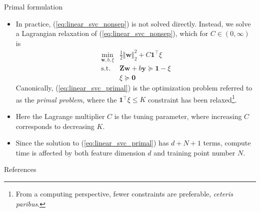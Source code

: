 \documentclass{beamer}
\numberwithin{equation}{section}
\newcommand{\aref}[1]{\alert{\ref{#1}}}
\begin{document}
\begin{frame}{Primal formulation}
    \begin{itemize}
        \item
        In practice, (\aref{eq:linear_svc_nonsep}) is not solved
        directly. Instead, we solve a Lagrangian relaxation of
        (\aref{eq:linear_svc_nonsep}), which for $ C \in (0, \infty) $ is
        \begin{equation} \label{eq:linear_svc_primal}
            \begin{array}{ll}
                \displaystyle\min_{\mathbf{w}, b, \xi} &
                \frac{1}{2}\Vert\mathbf{w}\Vert_2^2 + C\mathbf{1}^\top\xi \\
                \text{s.t.} &
                \mathbf{Zw} + b\mathbf{y} \succeq \mathbf{1} - \xi \\
                & \xi \succeq \mathbf{0}
            \end{array}
        \end{equation}
        Canonically, (\aref{eq:linear_svc_primal}) is the optimization
        problem referred to as the \textit{primal problem}, where the
        $ \mathbf{1}^\top\xi \le K $ constraint has been relaxed\footnote{
            From a computing perspective, fewer constraints are
            preferable, \textit{ceteris paribus}.
        }.

        \item
        Here the Lagrange multiplier $ C $ is the tuning parameter, where
        increasing $ C $ corresponds to decreasing $ K $.

        \item
        Since the solution to (\aref{eq:linear_svc_primal}) has $ d + N + 1 $
        terms, compute time is affected by both feature dimension $ d $ and
        training point number $ N $.
    \end{itemize}
\end{frame}

%

\begin{frame}{References}
    
    
\end{frame}
\end{document}
